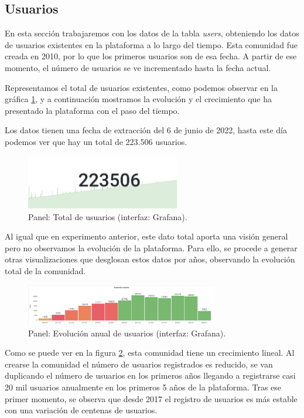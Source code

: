 \documentclass[a4paper, 12pt]{book}
\begin{document}
\subsection{Usuarios}
En esta sección trabajaremos con los datos de la tabla \emph{users}, obteniendo los datos de usuarios existentes en la plataforma a lo largo del tiempo. Esta comunidad fue creada en 2010, por lo que los primeros usuarios son de esa fecha. A partir de ese momento, el número de usuarios se ve incrementado hasta la fecha actual. 

Representamos el total de usuarios existentes, como podemos observar en la gráfica \ref{figura:total_users_tex}, y a continuación mostramos la evolución y el crecimiento que ha presentado la plataforma con el paso del tiempo. 

Los datos tienen una fecha de extracción del 6 de junio de 2022, hasta este día podemos ver que hay un total de 223.506 usuarios. 

\begin{figure}[ht]
    \centering
    \includegraphics[width=0.6\textwidth]{img/tex/Total_usuarios_tex.png}
    \caption{Panel: Total de usuarios (interfaz: Grafana).}
    \label{figura:total_users_tex}
\end{figure}


Al igual que en experimento anterior, este dato total aporta una visión general pero no observamos la evolución de la plataforma. Para ello, se procede a generar otras visualizaciones que desglosan estos datos por años, observando la evolución total de la comunidad.

\begin{figure}[ht]
    \centering
    \includegraphics[width=0.75\textwidth]{img/tex/evolucion_usuarios_tex.png}
    \caption{Panel: Evolución anual de usuarios (interfaz: Grafana).}
    \label{figura:evo_users_tex}
\end{figure}

Como se puede ver en la figura \ref{figura:evo_users_tex}, esta comunidad tiene un crecimiento lineal. Al crearse la comunidad el número de usuarios registrados es reducido, se van duplicando el número de usuarios en los primeros años llegando a registrarse casi 20 mil usuarios anualmente en los primeros 5 años de la plataforma. Tras ese primer momento, se observa que desde 2017 el registro de usuarios es más estable con una variación de centenas de usuarios.
\end{document}
